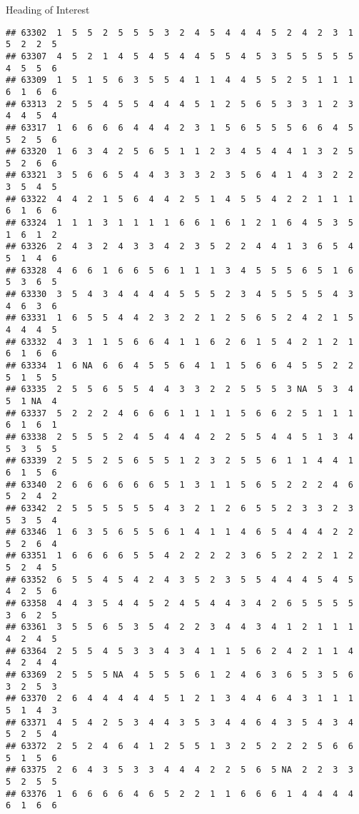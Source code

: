\documentclass[
  ignorenonframetext,
]{beamer}
\begin{document}
\begin{frame}[fragile]{Heading of Interest}
\begin{verbatim}
## 63302  1  5  5  2  5  5  5  3  2  4  5  4  4  4  5  2  4  2  3  1  5  2  2  5
## 63307  4  5  2  1  4  5  4  5  4  4  5  5  4  5  3  5  5  5  5  5  4  5  5  6
## 63309  1  5  1  5  6  3  5  5  4  1  1  4  4  5  5  2  5  1  1  1  6  1  6  6
## 63313  2  5  5  4  5  5  4  4  4  5  1  2  5  6  5  3  3  1  2  3  4  4  5  4
## 63317  1  6  6  6  6  4  4  4  2  3  1  5  6  5  5  5  6  6  4  5  5  2  5  6
## 63320  1  6  3  4  2  5  6  5  1  1  2  3  4  5  4  4  1  3  2  5  5  2  6  6
## 63321  3  5  6  6  5  4  4  3  3  3  2  3  5  6  4  1  4  3  2  2  3  5  4  5
## 63322  4  4  2  1  5  6  4  4  2  5  1  4  5  5  4  2  2  1  1  1  6  1  6  6
## 63324  1  1  1  3  1  1  1  1  6  6  1  6  1  2  1  6  4  5  3  5  1  6  1  2
## 63326  2  4  3  2  4  3  3  4  2  3  5  2  2  4  4  1  3  6  5  4  5  1  4  6
## 63328  4  6  6  1  6  6  5  6  1  1  1  3  4  5  5  5  6  5  1  6  5  3  6  5
## 63330  3  5  4  3  4  4  4  4  5  5  5  2  3  4  5  5  5  5  4  3  4  6  3  6
## 63331  1  6  5  5  4  4  2  3  2  2  1  2  5  6  5  2  4  2  1  5  4  4  4  5
## 63332  4  3  1  1  5  6  6  4  1  1  6  2  6  1  5  4  2  1  2  1  6  1  6  6
## 63334  1  6 NA  6  6  4  5  5  6  4  1  1  5  6  6  4  5  5  2  2  5  1  5  5
## 63335  2  5  5  6  5  5  4  4  3  3  2  2  5  5  5  3 NA  5  3  4  5  1 NA  4
## 63337  5  2  2  2  4  6  6  6  1  1  1  1  5  6  6  2  5  1  1  1  6  1  6  1
## 63338  2  5  5  5  2  4  5  4  4  4  2  2  5  5  4  4  5  1  3  4  5  3  5  5
## 63339  2  5  5  2  5  6  5  5  1  2  3  2  5  5  6  1  1  4  4  1  6  1  5  6
## 63340  2  6  6  6  6  6  6  5  1  3  1  1  5  6  5  2  2  2  4  6  5  2  4  2
## 63342  2  5  5  5  5  5  5  4  3  2  1  2  6  5  5  2  3  3  2  3  5  3  5  4
## 63346  1  6  3  5  6  5  5  6  1  4  1  1  4  6  5  4  4  4  2  2  5  2  6  4
## 63351  1  6  6  6  6  5  5  4  2  2  2  2  3  6  5  2  2  2  1  2  5  2  4  5
## 63352  6  5  5  4  5  4  2  4  3  5  2  3  5  5  4  4  4  5  4  5  4  2  5  6
## 63358  4  4  3  5  4  4  5  2  4  5  4  4  3  4  2  6  5  5  5  5  3  6  2  5
## 63361  3  5  5  6  5  3  5  4  2  2  3  4  4  3  4  1  2  1  1  1  4  2  4  5
## 63364  2  5  5  4  5  3  3  4  3  4  1  1  5  6  2  4  2  1  1  4  4  2  4  4
## 63369  2  5  5  5 NA  4  5  5  5  6  1  2  4  6  3  6  5  3  5  6  3  2  5  3
## 63370  2  6  4  4  4  4  4  5  1  2  1  3  4  4  6  4  3  1  1  1  5  1  4  3
## 63371  4  5  4  2  5  3  4  4  3  5  3  4  4  6  4  3  5  4  3  4  5  2  5  4
## 63372  2  5  2  4  6  4  1  2  5  5  1  3  2  5  2  2  2  5  6  6  5  1  5  6
## 63375  2  6  4  3  5  3  3  4  4  4  2  2  5  6  5 NA  2  2  3  3  5  2  5  5
## 63376  1  6  6  6  6  4  6  5  2  2  1  1  6  6  6  1  4  4  4  4  6  1  6  6

\end{verbatim}
\end{frame}
\end{document}
